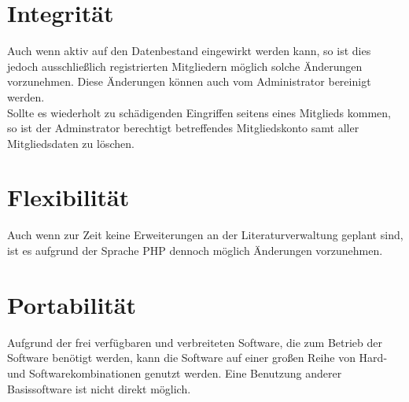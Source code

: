 \section{Integrität}
Auch wenn aktiv auf den Datenbestand eingewirkt werden kann, so ist dies jedoch ausschlie\ss lich registrierten Mitgliedern m\"oglich solche \"Anderungen vorzunehmen.
Diese \"Anderungen k\"onnen auch vom Administrator bereinigt werden.\\
Sollte es wiederholt zu sch\"adigenden Eingriffen seitens eines Mitglieds kommen, so ist der Adminstrator berechtigt betreffendes Mitgliedskonto samt aller Mitgliedsdaten zu l\"oschen.

\section{Flexibilität}
Auch wenn zur Zeit keine Erweiterungen an der Literaturverwaltung geplant sind, ist es aufgrund der Sprache PHP dennoch m\"oglich \"Anderungen vorzunehmen.

\section{Portabilität}
Aufgrund der frei verfügbaren und verbreiteten Software, die zum Betrieb der Software benötigt werden, kann die Software auf einer großen Reihe von Hard- und Softwarekombinationen genutzt werden. Eine Benutzung anderer Basissoftware ist nicht direkt möglich.
